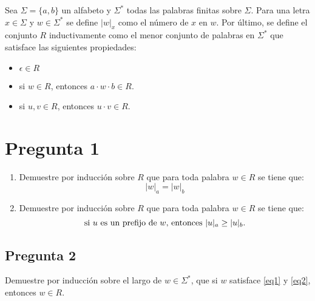 \documentclass[letter]{article}
\begin{document}
	\begin{pregunta}{1} %
		Sea $\Sigma= \{a,b\}$ un alfabeto y $\Sigma^{*}$ todas las palabras finitas sobre $\Sigma$. Para una letra $x\in \Sigma$ y $w\in \Sigma^{*}$ se define $|w|_{x}$ como el número de $x$ en $w$. Por último, se define el conjunto $R$ inductivamente como el menor conjunto de palabras en $\Sigma^{*}$ que satisface las siguientes propiedades:
		\begin{itemize}
		\item $\epsilon \in R$
		\item si $w\in R$, entonces $a\cdot w \cdot b \in R$.
		\item si $u, v\in R$, entonces $u\cdot v\in R$.
		\end{itemize}
		\section*{Pregunta 1}
		\begin{enumerate}
		\item Demuestre por inducción sobre $R$ que para toda palabra $w\in R$ se tiene que:
		\begin{equation}\label{eq1}
		|w|_{a} = |w|_{b}
		\end{equation}
		\item Demuestre por inducción sobre $R$ que para toda palabra $w\in R$ se tiene que:
		\begin{equation}\label{eq2}	
		\textup{si } u \textup{ es un prefijo de } w\textup{, entonces }|u|_{a}\geq |u|_{b}.
		\end{equation}
		\end{enumerate}
		
	\end{pregunta}
	
	\begin{pregunta}{2}
		\section*{Pregunta 2}
		Demuestre por inducción sobre el largo de $w\in \Sigma^{*}$, que si $w$ satisface \eqref{eq1} y \eqref{eq2}, entonces $w\in R$.
		
	\end{pregunta}
\end{document}
